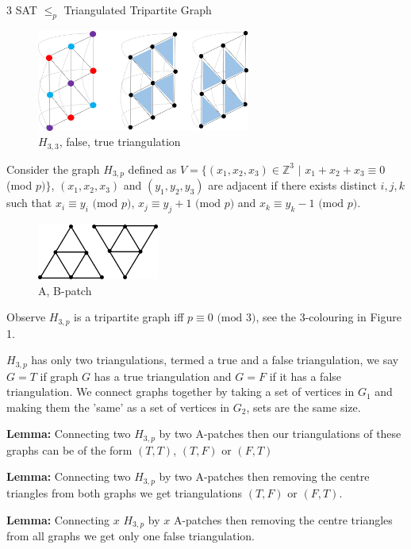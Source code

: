 \documentclass[final]{beamer}
\newlength{\colwidth}
\newcounter{col}
\begin{document}
\begin{frame}[t]
\begin{columns}[t]
\begin{column}{\colwidth}
\begin{block}{3 SAT $\leq_p$ Triangulated Tripartite Graph \cite{doi:10.1137/0210054}}
\begin{figure}
		\vspace{-25pt}
		\includegraphics[width=70mm]{holyer_graph.png}
		\caption{$H_{3,3}$, false, true triangulation}
		\vspace{-15pt}
\end{figure}

Consider the graph $H_{3,p}$ defined as $V=\{(x_1,x_2,x_3)\in \mathbb{Z}^3$ $|$ $x_1+x_2+x_3\equiv 0$ (mod $p)\}$, $(x_1,x_2,x_3)$ and $(y_1,y_2,y_3)$ are adjacent if there exists distinct $i,j,k$ such that $x_i\equiv y_i \text{ (mod }p)$, $x_j\equiv y_j+1 \text{ (mod }p)$ and $x_k\equiv y_k-1 \text{ (mod }p)$.

\begin{figure}
		\includegraphics[width=40mm]{patches.png}
		\caption{A, B-patch}
		\vspace{-20pt}
\end{figure}

Observe $H_{3,p}$ is a tripartite graph iff $p\equiv0 \text{ (mod }3)$, see the 3-colouring in Figure 1.

$H_{3,p}$ has only two triangulations, termed a true and a false triangulation, we say $G=T$ if graph $G$ has a true triangulation and $G=F$ if it has a false triangulation. We connect graphs together by taking a set of vertices in $G_1$ and making them the 'same' as a set of vertices in $G_2$, sets are the same size.

\textbf{Lemma:} Connecting two $H_{3,p}$ by two A-patches then our triangulations of these graphs can be of the form $(T,T)$, $(T,F)$ or $(F,T)$

\textbf{Lemma:} Connecting two $H_{3,p}$ by two A-patches then removing the centre triangles from both graphs we get triangulations $(T,F)$ or $(F,T)$.

\textbf{Lemma:} Connecting $x$ $H_{3,p}$ by $x$ A-patches then removing the centre triangles from all graphs we get only one false triangulation.


\end{block}
\end{column}
\end{columns}
\end{frame}
\end{document}
